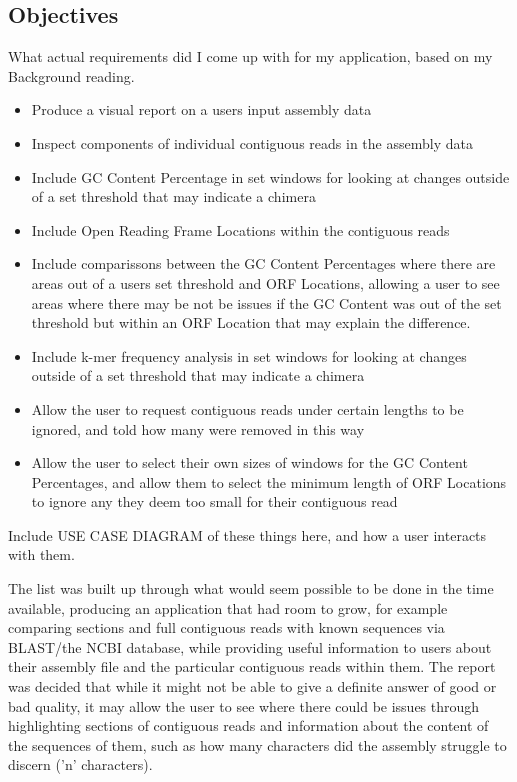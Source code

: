 \subsection{Objectives}
What actual requirements did I come up with for my application, based on my Background reading.
\begin{itemize}
\item Produce a visual report on a users input assembly data
\item Inspect components of individual contiguous reads in the assembly data
\item Include GC Content Percentage in set windows for looking at changes outside of a set threshold that may indicate a chimera
\item Include Open Reading Frame Locations within the contiguous reads
\item Include comparissons between the GC Content Percentages where there are areas out of a users set threshold and ORF  Locations, allowing a user to see areas where there may be not be issues if the GC Content was out of the set threshold but within an ORF Location that may explain the difference.
\item Include k-mer frequency analysis  in set windows for looking at changes outside of a set threshold that may indicate a chimera
\item Allow the user to request contiguous reads under certain lengths to be ignored, and told how many were removed in this way
\item Allow the user to select their own sizes of windows for the GC Content Percentages, and allow them to select the minimum length of ORF Locations to ignore any they deem too small for their contiguous read
\end{itemize}

Include USE CASE DIAGRAM of these things here, and how a user interacts with them.

The list was built up through what would seem possible to be done in the time available, producing an application that had room to grow, for example comparing sections and full contiguous reads with known sequences via BLAST/the NCBI database, while providing useful information to users about their assembly file and the particular contiguous reads within them. The report was decided that while it might not be able to give a definite answer of good or bad quality, it may allow the user to see where there could be issues through highlighting sections of contiguous reads and information about the content of the sequences of them, such as how many characters did the assembly struggle to discern ('n' characters).

